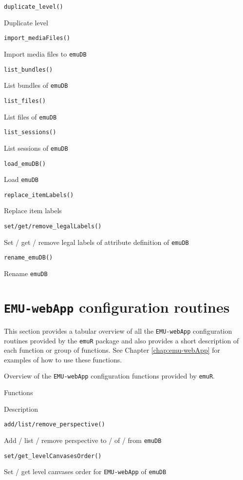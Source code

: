\documentclass[
]{book}
\begin{document}
\texttt{duplicate\_level()}

Duplicate level

\texttt{import\_mediaFiles()}

Import media files to \texttt{emuDB}

\texttt{list\_bundles()}

List bundles of \texttt{emuDB}

\texttt{list\_files()}

List files of \texttt{emuDB}

\texttt{list\_sessions()}

List sessions of \texttt{emuDB}

\texttt{load\_emuDB()}

Load \texttt{emuDB}

\texttt{replace\_itemLabels()}

Replace item labels

\texttt{set/get/remove\_legalLabels()}

Set / get / remove legal labels of attribute definition of \texttt{emuDB}

\texttt{rename\_emuDB()}

Rename \texttt{emuDB}

\hypertarget{sec:emuRpackageDetails-emuWebAppConfig}{%
\section{\texorpdfstring{\texttt{EMU-webApp} configuration routines}{EMU-webApp configuration routines}}\label{sec:emuRpackageDetails-emuWebAppConfig}}

This section provides a tabular overview of all the \texttt{EMU-webApp} configuration routines provided by the \texttt{emuR} package and also provides a short description of each function or group of functions. See Chapter \ref{chap:emu-webApp} for examples of how to use these functions.

\label{tab:emuRpackageDetails-emuWebAppConfig}Overview of the \texttt{EMU-webApp} configuration functions provided by \texttt{emuR}.

Functions

Description

\texttt{add/list/remove\_perspective()}

Add / list / remove perspective to / of / from \texttt{emuDB}

\texttt{set/get\_levelCanvasesOrder()}

Set / get level canvases order for \texttt{EMU-webApp} of \texttt{emuDB}
\end{document}
